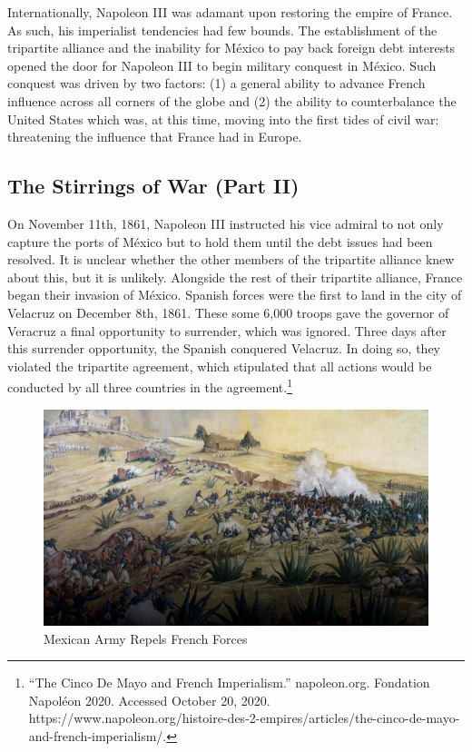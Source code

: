 \documentclass[10pt, letterpaper]{article}
\begin{document}
Internationally, Napoleon III was adamant upon restoring the empire of
France. As such, his imperialist tendencies had few bounds. The
establishment of the tripartite alliance and the inability for México to
pay back foreign debt interests opened the door for Napoleon III to
begin military conquest in México. Such conquest was driven by two
factors: (1) a general ability to advance French influence across all
corners of the globe and (2) the ability to counterbalance the United
States which was, at this time, moving into the first tides of civil
war: threatening the influence that France had in Europe. \\

\subsection{The Stirrings of War (Part II)}

On November 11th, 1861, Napoleon III instructed his vice admiral to not
only capture the ports of México but to hold them until the debt issues
had been resolved. It is unclear whether the other members of the
tripartite alliance knew about this, but it is unlikely. Alongside the
rest of their tripartite alliance, France began their invasion of
México. Spanish forces were the first to land in the city of Velacruz on
December 8th, 1861. These some 6,000 troops gave the governor of
Veracruz a final opportunity to surrender, which was ignored. Three days
after this surrender opportunity, the Spanish conquered Velacruz. In
doing so, they violated the tripartite agreement, which stipulated that
all actions would be conducted by all three countries in the
agreement.\footnote{``The Cinco De Mayo and French Imperialism.''
  napoleon.org. Fondation Napoléon 2020. Accessed October 20, 2020.
  https://www.napoleon.org/histoire-des-2-empires/articles/the-cinco-de-mayo-and-french-imperialism/.} \\

\begin{figure}
\centering
\includegraphics[scale = 0.35]{image1.jpg} 
\caption{Mexican Army Repels French Forces}
\end{figure} 
\end{document}
